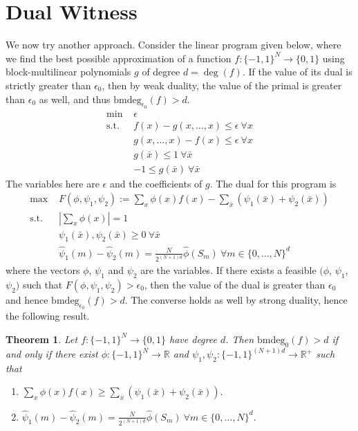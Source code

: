 \documentclass[12pt]{report}
\newtheorem{theorem}{Theorem}
\newcommand{\bmdeg}{\mathrm{bmdeg}}
\begin{document}
\section{Dual Witness}
We now try another approach. Consider the linear program given below, where we find the best possible approximation of a function $f\colon \{-1,1\}^N \rightarrow \{0,1\}$ using block-multilinear polynomials $g$ of degree $d = \deg(f)$. If the value of its dual is strictly greater than $\epsilon_0$, then by weak duality, the value of the primal is greater than $\epsilon_0$ as well, and thus $\bmdeg_{\epsilon_0}(f) > d$.
\begin{align*}
    \text{min } & \epsilon \\
    \text{s.t. } & f(x) - g(x, \ldots, x) \leq \epsilon ~\forall x\\
    & g(x, \ldots, x) - f(x) \leq \epsilon ~\forall x\\
    & g(\bar{x}) \leq 1 ~\forall \bar{x}\\
    & -1 \leq g(\bar{x}) ~\forall \bar{x}
\end{align*}
The variables here are $\epsilon$ and the coefficients of $g$. The dual for this program is
\begin{align*}
    \text{max } & F(\phi, \psi_1, \psi_2) := \sum_x \phi(x)f(x) - \sum_{\bar{x}} (\psi_1(\bar{x}) + \psi_2(\bar{x})) \\
    \text{s.t. } & \left|\sum_x \phi(x)\right| = 1 \\
    & \psi_1(\bar{x}), \psi_2(\bar{x}) \geq 0 ~\forall \bar{x} \\
    & {\hat{\psi}}_1(m) - {\hat{\psi}}_2(m) = \frac{N}{2^{(N+1)d}} \hat{\phi}(S_m) ~\forall m\in \{0, \ldots, N\}^d
\end{align*}
where the vectors $\phi$, $\psi_1$ and $\psi_2$ are the variables. If there exists a feasible $(\phi$, $\psi_1$, $\psi_2)$ such that $F(\phi, \psi_1, \psi_2) > \epsilon_0$, then the value of the dual is greater than $\epsilon_0$ and hence $\bmdeg_{\epsilon_0}(f) > d$. The converse holds as well 
by strong duality, hence the following result.

\begin{theorem}
Let $f\colon \{-1,1\}^N \rightarrow \{0,1\}$ have degree $d$. Then $\bmdeg_{0}(f) > d$ if and only if there exist $\phi\colon \{-1,1\}^N \rightarrow \mathbb{R}$ and $\psi_1, \psi_2\colon \{-1,1\}^{(N+1)d} \rightarrow \mathbb{R^+}$ such that \begin{enumerate}
    \item $\sum_x \phi(x)f(x) \geq \sum_{\bar{x}} (\psi_1(\bar{x}) + \psi_2(\bar{x})).$
    \item ${\hat{\psi}}_1(m) - {\hat{\psi}}_2(m) = \frac{N}{2^{(N+1)d}} \hat{\phi}(S_m) ~\forall m\in \{0, \ldots, N\}^d.$
\end{enumerate} 
\end{theorem}
\end{document}
